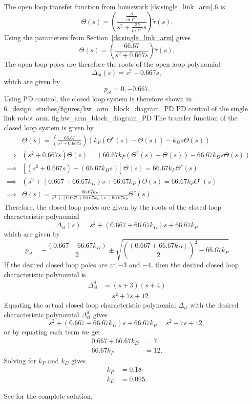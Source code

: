 
The open loop transfer function from homework \ref{ds:single_link_arm}.6 is
\[
\Theta(s) = \left(\frac{\frac{3}{m\ell^2}}{s^2+\frac{3b}{m\ell^2}s}\right)\tilde{\tau}(s).  
\]
Using the parameters from Section~\ref{ds:single_link_arm} gives
\[
\Theta(s) = \left(\frac{66.67}{s^2+0.667s}\right)\tilde{\tau}(s).  
\]
The open loop poles are therefore the roots of the open loop polynomial
\[
\Delta_{ol}(s) = s^2+0.667s,
\]
which are given by
\[
p_{ol} = 0, -0.667.
\]
Using PD control, the closed loop system is therefore shown in .
	{6_design_studies/figures/hw_arm_block_diagram_PD}
	{PD control of the single link robot arm.}
	{fig:hw_arm_block_diagram_PD}
The transfer function of the closed loop system is given by
\begin{align*}
& \Theta(s) = \left(\frac{66.67}{s^2+0.667s}\right)\left(k_P (\Theta^c(s)-\Theta(s)) - k_D s \Theta(s) \right)  \\
\implies & (s^2+0.667s)\Theta(s) = \left(66.67k_P (\Theta^c(s)-\Theta(s)) - 66.67k_D s \Theta(s) \right) \\
\implies & \left[(s^2+0.667s)+\left(66.67k_D s\right)\right]\Theta(s) = 66.67k_P \Theta^c(s)  \\
\implies & (s^2 + (0.667 + 66.67k_D)s + 66.67k_P)\Theta(s) = 66.67k_P \Theta^c(s)  \\
\implies & \Theta(s) = \frac{66.67k_P}{s^2 + (0.667 + 66.67k_D)s + 66.67k_P}\Theta^c(s). 
\end{align*}
Therefore, the closed loop poles are given by the roots of the closed loop characteristic polynomial
\[
\Delta_{cl}(s) = s^2 + (0.667 + 66.67k_D)s + 66.67k_P
\]
which are given by
\[
p_{cl} = -\frac{(0.667 + 66.67k_D)}{2} \pm \sqrt{ \left(\frac{(0.667 + 66.67k_D)}{2}\right)^2 - 66.67k_P}
\]
If the desired closed loop poles are at $-3$ and $-4$, then the desired closed loop characteristic polynomial is
\begin{align*}
\Delta_{cl}^d &= (s+3)(s+4) \\
 &= s^2 + 7s + 12.
\end{align*}
Equating the actual closed loop characteristic polynomial $\Delta_{cl}$ with the desired characteristic polynomial $\Delta_{cl}^d$ gives
\[
s^2 + (0.667 + 66.67k_D)s + 66.67k_P = s^2 + 7s + 12,
\]
or by equating each term we get 
\begin{align*}
0.667 + 66.67k_D &=7 \\
66.67k_P &= 12.
\end{align*}
Solving for $k_P$ and $k_D$ gives
\begin{align*}
k_P &= 0.18 \\
k_D &= 0.095.
\end{align*}

See  for the complete solution.
